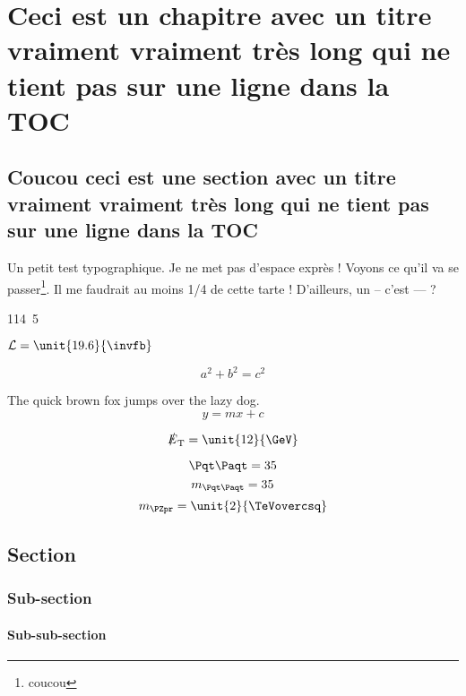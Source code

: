 \documentclass[twoside,titlepage,paper=a4,fontsize=12pt,numbers=noenddot,cleardoublepage=empty,BCOR=5mm,openright]{scrreprt}
\begin{document}
\raggedbottom %

\pagestyle{plain} 



\cleardoublepage
\cleardoublepage

\pagestyle{scrheadings} %

\cleardoublepage %

\chapter{Ceci est un chapitre avec un titre vraiment vraiment très long qui ne tient pas sur une ligne dans la TOC}

\section{Coucou ceci est une section avec un titre vraiment vraiment très long qui ne tient pas sur une ligne dans la TOC}

Un petit test typographique. Je ne met pas d'espace exprès ! Voyons ce qu'il va se passer\footnote{coucou}. Il me faudrait au moins 1/4 de cette tarte ! D'ailleurs, un -- c'est --- ?

\unit{114.5}{\GeVoverc}

$\lumi = \unit{19.6}{\invfb}$

$$a^2 + b^2 = c^2$$

The quick brown fox jumps over the lazy dog.
\[ y = mx + c \]

$$ \MET = \unit{12}{\GeV} $$

$$ \ttbar = 35$$
$$ \mtt = 35$$
$$\mzp = \unit{2}{\TeVcc}$$

\lipsum

\section{Section}
\subsection{Sub-section}
\subsubsection{Sub-sub-section}
\end{document}
